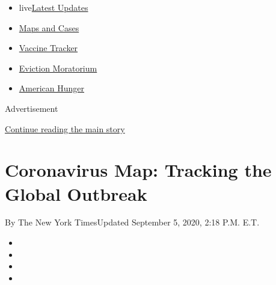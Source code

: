 \begin{itemize}
\tightlist
\item
  live\href{https://www.nytimes3xbfgragh.onion/2020/09/05/world/coronavirus-covid.html?name=styln-coronavirus-national\&region=TOP_BANNER\&block=storyline_menu_recirc\&action=click\&pgtype=Interactive\&impression_id=aecb3551-efba-11ea-b68e-f70513192fc8\&variant=undefined}{Latest
  Updates}
\item
  \href{https://www.nytimes3xbfgragh.onion/interactive/2020/us/coronavirus-us-cases.html?name=styln-coronavirus-national\&region=TOP_BANNER\&block=storyline_menu_recirc\&action=click\&pgtype=Interactive\&impression_id=aecb3552-efba-11ea-b68e-f70513192fc8\&variant=undefined}{Maps
  and Cases}
\item
  \href{https://www.nytimes3xbfgragh.onion/interactive/2020/science/coronavirus-vaccine-tracker.html?name=styln-coronavirus-national\&region=TOP_BANNER\&block=storyline_menu_recirc\&action=click\&pgtype=Interactive\&impression_id=aecb3553-efba-11ea-b68e-f70513192fc8\&variant=undefined}{Vaccine
  Tracker}
\item
  \href{https://www.nytimes3xbfgragh.onion/2020/09/02/your-money/eviction-moratorium-covid.html?name=styln-coronavirus-national\&region=TOP_BANNER\&block=storyline_menu_recirc\&action=click\&pgtype=Interactive\&impression_id=aecb5c60-efba-11ea-b68e-f70513192fc8\&variant=undefined}{Eviction
  Moratorium}
\item
  \href{https://www.nytimes3xbfgragh.onion/interactive/2020/09/02/magazine/food-insecurity-hunger-us.html?name=styln-coronavirus-national\&region=TOP_BANNER\&block=storyline_menu_recirc\&action=click\&pgtype=Interactive\&impression_id=aecb5c61-efba-11ea-b68e-f70513192fc8\&variant=undefined}{American
  Hunger}
\end{itemize}

Advertisement

\protect\hyperlink{after-top}{Continue reading the main story}

\hypertarget{coronavirus-map-tracking-the-global-outbreak}{%
\section{Coronavirus Map: Tracking the Global
Outbreak}\label{coronavirus-map-tracking-the-global-outbreak}}

By The New York TimesUpdated September 5, 2020, 2:18 P.M. E.T.

\begin{itemize}
\item
\item
\item
\item
\end{itemize}

